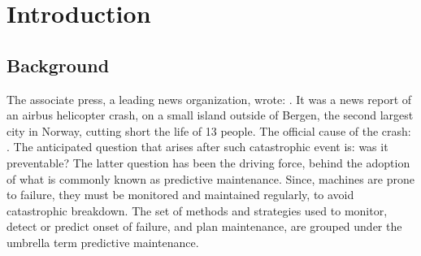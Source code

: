 \documentclass[../Main/thesis.tex]{subfiles}
\begin{document}
\chapter{Introduction}
\label{ch:introduction}

\section{Background}
\label{sec:background}
The associate press, a leading news organization, wrote: .
It was a news report of an airbus helicopter crash, on a small island outside of Bergen, the second largest city in Norway, cutting short the life of 13 people. The official cause of the crash: . The anticipated question that arises after such catastrophic event is: was it preventable?
\justify
The latter question has been the driving force, behind the adoption of what is commonly known as predictive maintenance.
Since, machines are prone to failure, they must be monitored and maintained regularly, to avoid catastrophic breakdown.
The set of methods and strategies used to monitor, detect or predict onset of failure, and plan maintenance, are grouped under the umbrella term predictive maintenance.
\justify
\end{document}
